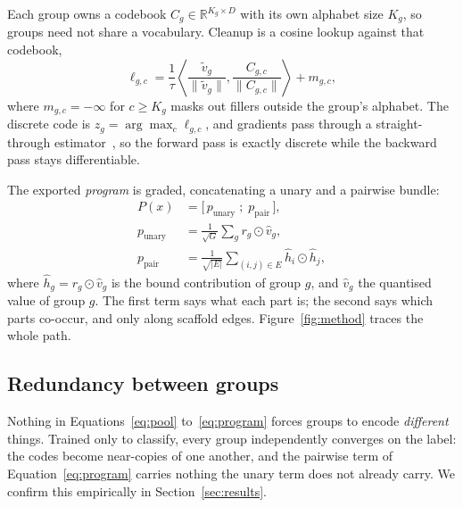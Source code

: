 Each group owns a codebook $C_g \in \mathbb{R}^{K_g \times D}$ with its own
alphabet size $K_g$, so groups need not share a vocabulary. Cleanup is a cosine
lookup against that codebook,
\begin{equation}
  \ell_{g,c} = \frac{1}{\tau}
  \left\langle \frac{\tilde{v}_g}{\lVert \tilde{v}_g \rVert},
               \frac{C_{g,c}}{\lVert C_{g,c} \rVert} \right\rangle
  + m_{g,c},
  \label{eq:cleanup}
\end{equation}
where $m_{g,c} = -\infty$ for $c \geq K_g$ masks out fillers outside the group's
alphabet. The discrete code is $z_g = \arg\max_c \ell_{g,c}$, and gradients pass
through a straight-through estimator~\cite{bengio2013estimating,oord2017neural}, so the forward pass is exactly discrete
while the backward pass stays differentiable.

The exported \emph{program} is graded, concatenating a unary and a pairwise
bundle:
\begin{equation}
  \begin{aligned}
    P(x) &= \bigl[\, p_{\text{unary}} \;;\; p_{\text{pair}} \,\bigr],\\
    p_{\text{unary}} &= \tfrac{1}{\sqrt{G}}\textstyle\sum\nolimits_g r_g \odot \hat{v}_g,\\
    p_{\text{pair}} &= \tfrac{1}{\sqrt{|E|}}\textstyle\sum\nolimits_{(i,j) \in E}
       \hat{h}_i \odot \hat{h}_j,
  \end{aligned}
  \label{eq:program}
\end{equation}
where $\hat{h}_g = r_g \odot \hat{v}_g$ is the bound contribution of group $g$,
and $\hat{v}_g$ the quantised value of group $g$. The first term says what each
part is; the second says which parts co-occur, and only along scaffold edges.
Figure~\ref{fig:method} traces the whole path.

\subsection{Redundancy between groups}
\label{sec:penalty}

Nothing in Equations~\ref{eq:pool} to~\ref{eq:program} forces groups to encode
\emph{different} things. Trained only to classify, every group independently
converges on the label: the codes become near-copies of one another, and the
pairwise term of Equation~\ref{eq:program} carries nothing the unary term does
not already carry. We confirm this empirically in Section~\ref{sec:results}.

